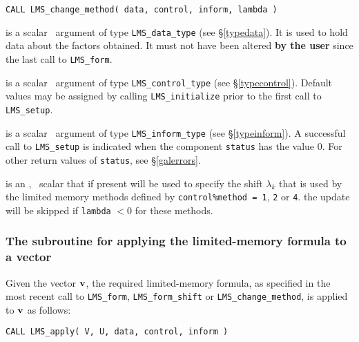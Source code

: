 \documentclass{galahad}
\newcommand{\packagename}{LMS}
\begin{document}
\hspace{8mm}
{\tt CALL \packagename\_change\_method( data, control, inform, lambda )}

\vspace*{-3mm}
\begin{description}

 is a scalar \intentinout\ argument of type
{\tt \packagename\_data\_type}
(see \S\ref{typedata}). It is used to hold data about the factors obtained.
It must not have been altered {\bf by the user} since the last call to
{\tt \packagename\_form}.

 is a scalar \intentin\ argument of type
{\tt \packagename\_control\_type}
(see \S\ref{typecontrol}). Default values may be assigned by calling
{\tt \packagename\_initialize} prior to the first call to
{\tt \packagename\_setup}.

 is a scalar \intentout\ argument of type
{\tt \packagename\_inform\_type}
(see \S\ref{typeinform}). A successful call to
{\tt \packagename\_setup}
is indicated when the  component {\tt status} has the value 0.
For other return values of {\tt status}, see \S\ref{galerrors}.

 is an \optional, \intentin\ \realdp scalar that if present
will be used to specify the shift $\lambda_k$ that is used by the
limited memory methods defined by
{\tt control\%method = 1}, {\tt 2} or {\tt 4}.
\restriction the update will be skipped if {\tt lambda} $< 0$
for these methods.

\end{description}


\subsubsection{The subroutine for applying the limited-memory formula to a
vector}
Given the vector ${\mathbf{v}}$, the required limited-memory formula,
as specified in the most recent call to {\tt \packagename\_form},
{\tt \packagename\_form\_\-shift} or
{\tt \packagename\_change\_method},
is applied to ${\mathbf{v}}$ as follows:
\vspace*{1mm}

\hspace{8mm}
{\tt CALL \packagename\_apply( V, U, data, control, inform )}
\end{document}
